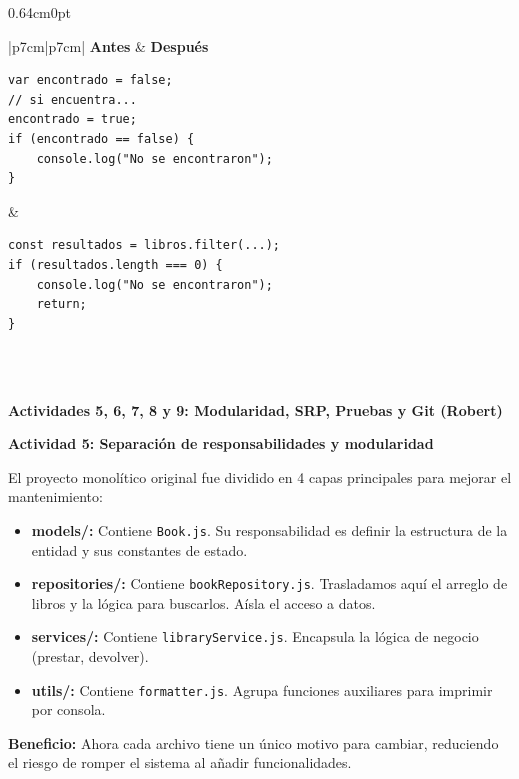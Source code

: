 \documentclass[12pt,letterpaper]{article}
\begin{document}
\begin{adjustwidth}{0.64cm}{0pt}
\begin{table}[H]
\centering
\small
\renewcommand{\arraystretch}{1.4}
\caption{YAGNI: código Antes y Después}
\begin{tabular}{|p{7cm}|p{7cm}|}
\hline
\textbf{Antes} & \textbf{Después} \\
\hline
\begin{minipage}[t]{\linewidth}
\vspace{2pt}
\begin{lstlisting}
var encontrado = false;
// si encuentra... 
encontrado = true;
if (encontrado == false) {
    console.log("No se encontraron");
}
\end{lstlisting}
\vspace{2pt}
\end{minipage}
& \begin{minipage}[t]{\linewidth}
\vspace{2pt}
\begin{lstlisting}
const resultados = libros.filter(...);
if (resultados.length === 0) {
    console.log("No se encontraron");
    return;
}
\end{lstlisting}
\vspace{2pt}
\end{minipage} \\
\hline
{} \\
\hline
\end{tabular}
\end{table}


\textbf{Actividades 5, 6, 7, 8 y 9: Modularidad, SRP, Pruebas y Git (Robert)}

\vspace{8pt}
\textbf{Actividad 5: Separaci\'on de responsabilidades y modularidad}

\vspace{4pt}
El proyecto monol\'itico original fue dividido en 4 capas principales para mejorar el mantenimiento:
\begin{itemize}[leftmargin=1.27cm, label=\textbullet, topsep=1pt, itemsep=0pt, parsep=0pt]
  \item \textbf{models/:} Contiene \texttt{Book.js}. Su responsabilidad es definir la estructura de la entidad y sus constantes de estado.
  \item \textbf{repositories/:} Contiene \texttt{bookRepository.js}. Trasladamos aqu\'i el arreglo de libros y la l\'ogica para buscarlos. A\'isla el acceso a datos.
  \item \textbf{services/:} Contiene \texttt{libraryService.js}. Encapsula la l\'ogica de negocio (prestar, devolver).
  \item \textbf{utils/:} Contiene \texttt{formatter.js}. Agrupa funciones auxiliares para imprimir por consola.
\end{itemize}
\textbf{Beneficio:} Ahora cada archivo tiene un \'unico motivo para cambiar, reduciendo el riesgo de romper el sistema al a\~nadir funcionalidades.


\end{adjustwidth}
\end{document}
